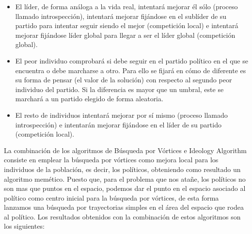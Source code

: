 \documentclass[11pt,a4paper]{article}
\begin{document}
	\begin{itemize}
		\item El líder, de forma análoga a la vida real, intentará mejorar él sólo (proceso llamado introspección), intentará mejorar fijándose en el sublíder de su partido para intentar seguir siendo el mejor (competición local) e intentará mejorar fijándose líder global para llegar a ser el líder global (competición global).
		\item El peor individuo comprobará si debe seguir en el partido político en el que se encuentra o debe marcharse a otro. Para ello se fijará en cómo de diferente es su forma de pensar (el valor de la solución) con respecto al segundo peor individuo del partido. Si la diferencia es mayor que un umbral, este se marchará a un partido elegido de forma aleatoria.
		\item El resto de individuos intentará mejorar por sí mismo (proceso llamado introspección) e intentarán mejorar fijándose en el líder de su partido (competición local).
	\end{itemize}
	
	
	\noindent La combinación de los algoritmos de Búsqueda por Vórtices e Ideology Algorithm consiste en emplear la búsqueda por vórtices como mejora local para los individuos de la población, es decir, los políticos, obteniendo como resultado un algoritmo memético. Puesto que, para el problema que nos atañe, los políticos no son mas que puntos en el espacio, podemos dar el punto en el espacio asociado al político como centro inicial para la búsqueda por vórtices, de esta forma lanzamos una búsqueda por trayectorias simples en el área del espacio que rodea al político. Los resultados obtenidos con la combinación de estos algoritmos son los siguientes:\\
	
\end{document}
